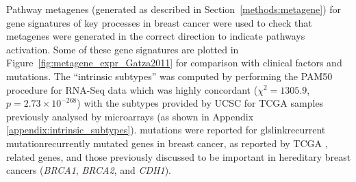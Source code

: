 Pathway \glspl{metagene} (generated as described in Section~\ref{methods:metagene}) for gene signatures of key processes in breast cancer \citep{Gatza2011} were used to check that \glspl{metagene} were generated in the correct direction to indicate \glspl{pathway} activation. Some of these gene signatures are plotted in Figure~\ref{fig:metagene_expr_Gatza2011} for comparison with clinical factors and  \glspl{mutation}. The ``\glspl{intrinsic subtype}''  was computed by performing the \gls{PAM50} procedure \cite{Parker2009} for \gls{RNA-Seq} data which was highly concordant ($\chi^2 = 1305.9$, $p = 2.73 \times 10^{-268}$) with the subtypes provided by \gls{UCSC} \citep{UCSC2012} for \gls{TCGA} samples  \citep{TCGA2012} previously analysed by \glspl{microarray} (as shown in Appendix \ref{appendix:intrinsic_subtypes}).  \glspl{mutation} were reported for glslink{recurrent mutation}{recurrently mutated} genes in breast cancer, as reported by \gls{TCGA} \citep{TCGA2012}, related genes, and those previously discussed to be important in \gls{hereditary} breast cancers (\textit{BRCA1}, \textit{BRCA2}, and \textit{CDH1}).

